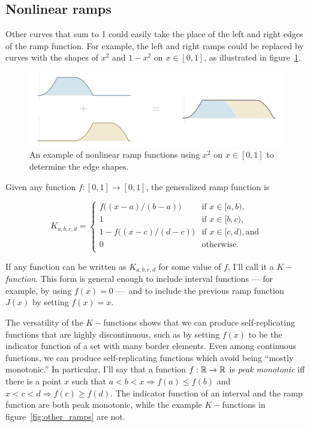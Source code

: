 \documentclass[20pt,]{extarticle}
\begin{document}
\subsection{Nonlinear ramps}\label{sec:nonlinear_ramps}

Other curves that sum to 1 could easily take the place of the left and
right edges of the ramp function. For example, the left and right ramps
could be replaced by curves with the shapes of \(x^2\) and \(1-x^2\) on
\(x\in [0, 1]\), as illustrated in figure~\ref{fig:nonlinear_ramps}.

\begin{figure}
\centering
\includegraphics{images/nonlinear_ramps2.png}
\caption{An example of nonlinear ramp functions using \(x^2\) on
\(x\in [0, 1]\) to determine the edge
shapes.}\label{fig:nonlinear_ramps}
\end{figure}

Given any function \(f:[0,1]\to [0,1]\), the generalized ramp function
is

\[ K_{a,b,c,d} = \begin{cases}
f\big((x - a) / (b - a)\big) & \text{if } x \in [a, b), \\
1 & \text{if } x \in [b, c), \\
1 - f\big((x - c) / (d - c)\big) & \text{if } x \in [c, d), \text{and} \\
0 & \text{otherwise.} \\
\end{cases}\]

If any function can be written as \(K_{a,b,c,d}\) for some value of
\(f\), I'll call it a \(K-\)\emph{function}. This form is general enough
to include interval functions --- for example, by using \(f(x) = 0\)
---~and to include the previous ramp function \(J(x)\) by setting
\(f(x)=x\).

The versatility of the \(K-\)functions shows that we can produce
self-replicating functions that are highly discontinuous, such as by
setting \(f(x)\) to be the indicator function of a set with many border
elements. Even among continuous functions, we can produce
self-replicating functions which avoid being ``mostly monotonic.'' In
particular, I'll say that a function \(f:\mathbb{R}\to\mathbb{R}\) is \emph{peak
monotonic} iff there is a point \(x\) such that
\(a < b < x \Rightarrow f(a) \le f(b)\) and
\(x < c < d \Rightarrow f(c) \ge f(d)\). The indicator function of an
interval and the ramp function are both peak monotonic, while the
example \(K-\)functions in figure~\ref{fig:other_ramps} are not.
\end{document}
